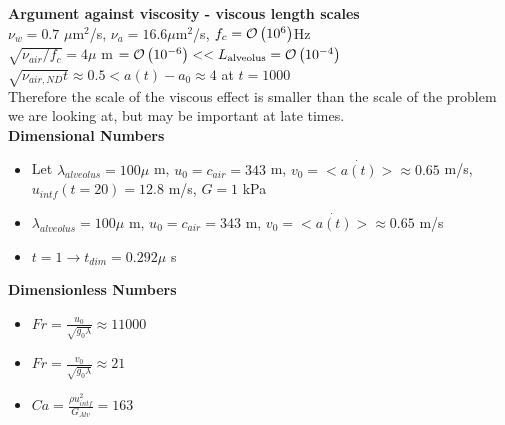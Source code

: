 \begin{frame}%

  {\small%
    \textbf{Argument against viscosity - viscous length scales}\\
    $\nu_{w}=0.7$ $\mu$m$^2$/s,\qquad
    $\nu_{a}=16.6 \mu$m$^2$/s,\qquad
    $f_c=\mathcal{O}\left(10^6\right)$Hz\\
    $\sqrt{\nu_{air}/f_c}=4\mu$ m $=\mathcal{O}\left(10^{-6}\right) << L_{\text{alveolus}}=\mathcal{O}\left(10^{-4}\right)$\\ \vspace*{4pt}
    $\sqrt{\nu_{air,ND}t} \approx0.5 < a(t)-a_0\approx4$ at $t=1000$\\ \vspace*{4pt}  
    Therefore the scale of the viscous effect is smaller than the scale of the problem we are looking at, but may be important at late times.\\
  }    
  \vspace*{0.25cm}
  \textbf{{\small Dimensional Numbers}}
  {\small
    \begin{itemize}
    \item Let $\lambda_{alveolus}=100 \mu$ m, $u_0=c_{air}=343$ m, $v_0=<\dot{a(t)}>\approx0.65$ m/s, $u_{intf}(t=20)=12.8$ m/s, $G=1$ kPa %
    \item $\lambda_{alveolus}=100 \mu$ m, $u_0=c_{air}=343$ m, $v_0=<\dot{a(t)}>\approx0.65$ m/s
    \item $t=1 \rightarrow t_{dim}=0.292 \mu$ s
    \end{itemize}
  }
  \vspace*{0.25cm}
  \textbf{{\small Dimensionless Numbers}}
  {\small
    \begin{itemize}
    \item $Fr=\frac{u_0}{\sqrt{g_0 \lambda}}\approx11000$
    \item $Fr=\frac{v_0}{\sqrt{g_0 \lambda}}\approx21$
    \item $Ca=\frac{\rho u_{intf}^2}{G_{Alv}} = 163$
    \end{itemize}
  }
\end{frame}




%   

